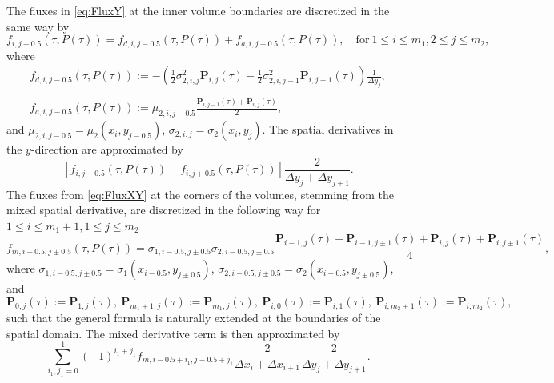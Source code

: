 \documentclass[10pt]{article}
\begin{document}
The fluxes in \eqref{eq:FluxY} at the inner volume boundaries are discretized in the same way by
\begin{equation}
f_{i,j-0.5}(\tau,P(\tau)) = f_{d,i,j-0.5}(\tau,P(\tau)) + f_{a,i,j-0.5}(\tau,P(\tau)), \quad \mathrm{for} \ 1 \le i \le m_{1}, 2 \le j \le m_{2},
\end{equation}
where
\begin{equation}
\begin{array}{l}
f_{d,i,j-0.5}(\tau,P(\tau)) := -\left( \tfrac{1}{2} \sigma^{2}_{2,i,j} \boldsymbol{P}_{i,j}(\tau) - \tfrac{1}{2} \sigma^{2}_{2,i,j-1} \boldsymbol{P}_{i,j-1}(\tau) \right) \frac{1}{\Delta y_{j}}, \\\\
f_{a,i,j-0.5}(\tau,P(\tau)) := \mu_{2,i,j-0.5} \frac{\boldsymbol{P}_{i,j-1}(\tau)+\boldsymbol{P}_{i,j}(\tau)}{2},
\end{array}
\end{equation}
and $\mu_{2,i,j-0.5} = \mu_{2}(x_{i},y_{j-0.5})$, $\sigma_{2,i,j} = \sigma_{2}(x_{i},y_{j})$. The spatial derivatives in the $y$-direction are approximated by
$$ \left[ f_{i,j-0.5}(\tau,P(\tau)) - f_{i,j+0.5}(\tau,P(\tau)) \right] \frac{2}{\Delta y_{j}+\Delta y_{j+1}}. $$
The fluxes from \eqref{eq:FluxXY} at the corners of the volumes, stemming from the mixed spatial derivative, are discretized in the following way for $1 \leq i \leq m_{1}+1, 1 \leq j \leq m_{2}$
\begin{equation} f_{m,i-0.5,j\pm0.5}(\tau,P(\tau)) = \sigma_{1,i-0.5,j\pm0.5}\sigma_{2,i-0.5,j\pm0.5} \frac{\boldsymbol{P}_{i-1,j}(\tau) + \boldsymbol{P}_{i-1,j\pm 1}(\tau)+\boldsymbol{P}_{i,j}(\tau)+\boldsymbol{P}_{i,j\pm 1}(\tau)}{4},  
\label{eq:DiscrMixedDerivative}
\end{equation}
where $\sigma_{1,i-0.5,j\pm0.5} = \sigma_{1}(x_{i-0.5},y_{j\pm0.5})$, $\sigma_{2,i-0.5,j\pm0.5} = \sigma_{2}(x_{i-0.5},y_{j\pm0.5})$, and
\begin{equation}
\boldsymbol{P}_{0,j}(\tau) := \boldsymbol{P}_{1,j}(\tau), \ \boldsymbol{P}_{m_{1}+1,j}(\tau):= \boldsymbol{P}_{m_{1},j}(\tau), \ \boldsymbol{P}_{i,0}(\tau) := \boldsymbol{P}_{i,1}(\tau), \ \boldsymbol{P}_{i,m_{2}+1}(\tau) := \boldsymbol{P}_{i,m_{2}}(\tau),
\label{eq:BoundaryMixedDerivative}
\end{equation}
such that the general formula is naturally extended at the boundaries of the spatial domain.
The mixed derivative term is then approximated by
$$ \sum_{i_{1},j_{1} = 0}^{1} (-1)^{i_{1}+j_{1}} f_{m,i-0.5 + i_{1},j-0.5+j_{1}} \frac{2}{\Delta x_{i}+\Delta x_{i+1}}\frac{2}{\Delta y_{j}+\Delta y_{j+1}}. $$
\end{document}
